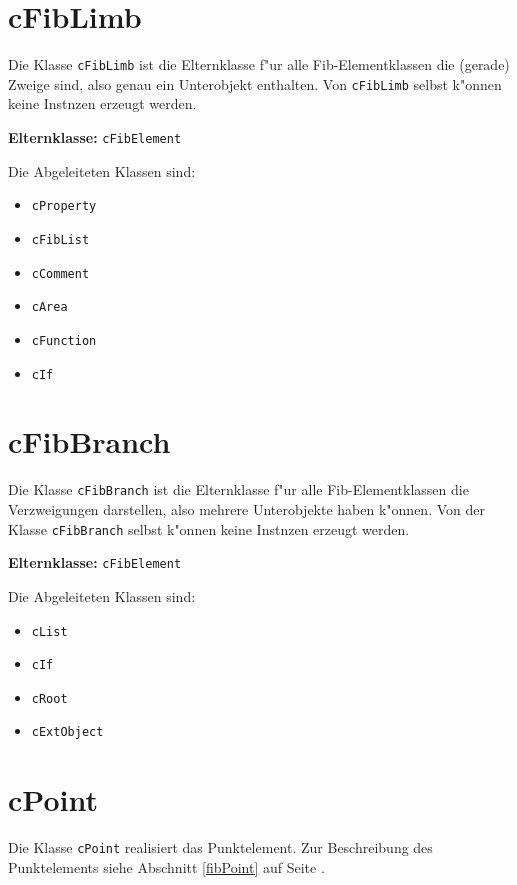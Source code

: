 \section{cFibLimb}
\label{secCFibLimb}

Die Klasse \verb|cFibLimb| ist die Elternklasse f"ur alle Fib-Elementklassen die (gerade) Zweige sind, also genau ein Unterobjekt enthalten. Von \verb|cFibLimb| selbst k"onnen keine Instnzen erzeugt werden.

\bigskip\noindent
\textbf{Elternklasse:} \verb|cFibElement|

\bigskip\noindent
Die Abgeleiteten Klassen sind:
\begin{itemize}
 \item \verb|cProperty|
 \item \verb|cFibList|
 \item \verb|cComment|
 \item \verb|cArea|
 \item \verb|cFunction|
 \item \verb|cIf|
\end{itemize}


\section{cFibBranch}
\label{secCFibBranch}

Die Klasse \verb|cFibBranch| ist die Elternklasse f"ur alle Fib-Elementklassen die Verzweigungen darstellen, also mehrere Unterobjekte haben k"onnen. Von der Klasse \verb|cFibBranch| selbst k"onnen keine Instnzen erzeugt werden.

\bigskip\noindent
\textbf{Elternklasse:} \verb|cFibElement|

\bigskip\noindent
Die Abgeleiteten Klassen sind:
\begin{itemize}
 \item \verb|cList|
 \item \verb|cIf|
 \item \verb|cRoot|
 \item \verb|cExtObject|
\end{itemize}


\section{cPoint}

Die Klasse \verb|cPoint| realisiert das Punktelement.
Zur Beschreibung des Punktelements siehe Abschnitt \ref{fibPoint} auf Seite \pageref{fibPoint} .

